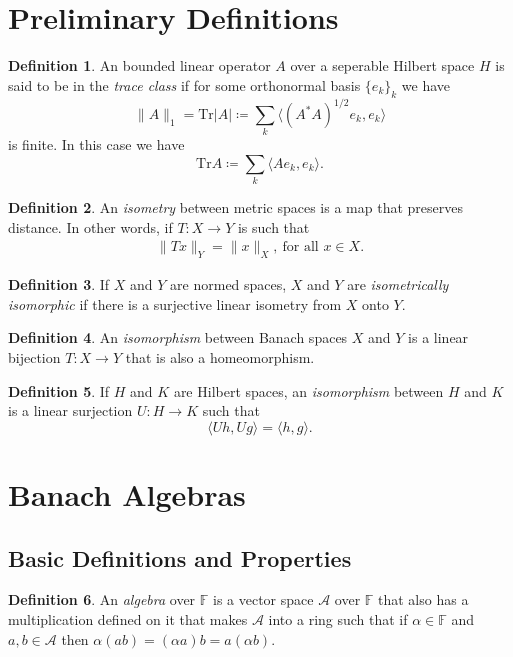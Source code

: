 \documentclass[leqno]{article}
\theoremstyle{definition}
\newtheorem{definition}{Definition}[section]
\theoremstyle{remark}
\theoremstyle{theorem}
\newcommand{\F}{\mathbb{F}}
\newcommand{\A}{\mathcal{A}}
\begin{document}
\section{Preliminary Definitions}

\begin{definition}
An bounded linear operator $A$ over a seperable Hilbert space $H$ is said to be in the \emph{trace class} if for some orthonormal basis $\{e_k\}_k$ we have
\[
\|A\|_1 = \mathrm{Tr}|A| \coloneqq \sum_{k} \langle (A^*A)^{1/2} e_k,e_k \rangle
\]
is finite. In this case we have
\[
\mathrm{Tr}A \coloneqq \sum_k \langle A e_k,e_k \rangle.
\]
\end{definition}

\begin{definition}
An \emph{isometry} between metric spaces is a map that preserves distance. In other words, if $T\colon X \to Y$ is such that 
\begin{align*}
\|Tx\|_Y = \|x\|_X, ~\textrm{for all $x\in X$}.
\end{align*}
\end{definition}

\begin{definition}
If $X$ and $Y$ are normed spaces, $X$ and $Y$ are \emph{isometrically isomorphic} if there is a surjective linear isometry from $X$ onto $Y$.
\end{definition}

\begin{definition}
An \emph{isomorphism} between Banach spaces $X$ and $Y$ is a linear bijection $T\colon X \to Y$ that is also a homeomorphism.
\end{definition}

\begin{definition}
If $H$ and $K$ are Hilbert spaces, an \emph{isomorphism} between $H$ and $K$ is a linear surjection $U\colon H \to K$ such that
\[
\langle Uh, Ug \rangle = \langle h, g\rangle.
\]
\end{definition}


\section{Banach Algebras}

\subsection{Basic Definitions and Properties}

\begin{definition}
An \emph{algebra} over $\F$ is a vector space $\A$ over $\F$ that also has a multiplication defined on it that makes $\A$ into a ring such that if $\alpha \in \F$ and $a,b\in \A$ then $\alpha(ab)=(\alpha a)b=a(\alpha b)$.
\end{definition}
\end{document}
